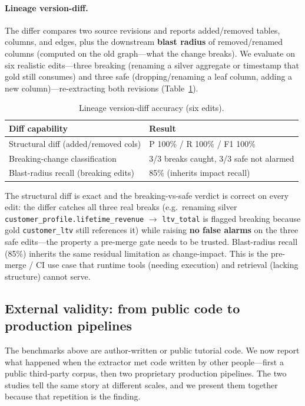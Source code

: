 \documentclass[11pt]{article}
\newcommand{\code}[1]{\texttt{#1}}
\begin{document}
\paragraph{Lineage version-diff.} The differ compares two source revisions and
reports added/removed tables, columns, and edges, plus the downstream \textbf{blast
radius} of removed/renamed columns (computed on the old graph---what the change
breaks). We evaluate on six realistic edits---three breaking (renaming a silver
aggregate or timestamp that gold still consumes) and three safe (dropping/renaming a
leaf column, adding a new column)---re-extracting both revisions
(Table~\ref{tab:diff}).

\begin{table}[h]
\centering
\caption{Lineage version-diff accuracy (six edits).}
\label{tab:diff}
\small
\begin{tabular}{@{}ll@{}}
\toprule
Diff capability & Result \\
\midrule
Structural diff (added/removed cols) & P 100\% / R 100\% / F1 100\% \\
Breaking-change classification & 3/3 breaks caught, 3/3 safe not alarmed \\
Blast-radius recall (breaking edits) & 85\% (inherits impact recall) \\
\bottomrule
\end{tabular}
\end{table}

The structural diff is exact and the breaking-vs-safe verdict is correct on every
edit: the differ catches all three real breaks (e.g.\ renaming silver
\code{customer_profile.\allowbreak lifetime_revenue} $\rightarrow$ \code{ltv_total} is flagged
breaking because gold \code{customer_ltv} still references it) while raising
\textbf{no false alarms} on the three safe edits---the property a pre-merge gate
needs to be trusted. Blast-radius recall (85\%) inherits the same residual
limitation as change-impact. This is the pre-merge / CI use case that runtime tools
(needing execution) and retrieval (lacking structure) cannot serve.

\subsection{External validity: from public code to production pipelines}
\label{sec:external}
\label{sec:production}
The benchmarks above are author-written or public tutorial code. We now report what
happened when the extractor met code written by other people---first a public
third-party corpus, then two proprietary production pipelines. The two studies tell
the same story at different scales, and we present them together because that
repetition is the finding.
\end{document}
